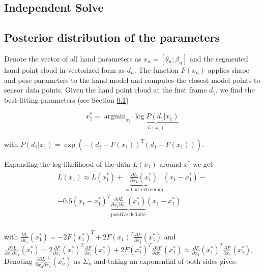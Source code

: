 \documentclass[10pt,twocolumn,letterpaper]{article}
\begin{document}
\subsection {Independent Solve} \label{sec:independent-solve}

\subsection {Posterior distribution of the parameters} \label{sec:posterior}

Denote the vector of all hand parameters as $x_n = [\theta_n; \beta_n]$ and the segmented hand point cloud in vectorized form as $d_n$. The function $F(x_n)$ applies shape and pose parameters to the hand model and computes the closest model points to sensor data points.  Given the hand point cloud at the first frame $d_1$, we find the best-fitting parameters (see Section \ref{sec:independent-solve})

\begin{equation}
x^*_1 = \operatorname{argmin}_{x_1} \underbrace{\log  P(d_1|x_1)}_{L(x_1)} \label{eq:independent}
\end{equation}

with $P(d_1|x_1) = \exp \left( - (d_1 - F(x_1))^T (d_1 - F(x_1)) \right)$.

Expanding the log-likelihood of the data $L(x_1)$ around $x_1^*$ we get
\begin{align}
\begin{split}
 L(x_1) \approx L(x_1^*) + \underbrace{\frac{\partial L}{\partial x_1}(x_1^*)}_{= 0 \text{ at extremum}}(x_1 - x_1^*) - \\
- 0.5(x_1 - x_1^*)^T \underbrace{\frac{\partial \partial L}{\partial x_1 \partial x_1}(x_1^*) }_{\text{positive definite}}  (x_1 - x_1^*) \\
\end{split}
\end{align}

with $\frac{\partial L}{\partial x_1}(x_1^*) = - 2 F(x_1^*)^T + 2 F(x_1)^T \frac{\partial F}{\partial x_1}(x_1^*)  $ and 
$\frac{\partial \partial L}{\partial x_1 \partial x_1}(x_1^*) = 2  \frac{\partial F}{\partial x_1}(x_1^*)^T  \frac{\partial F}{\partial x_1}(x_1^*) + 2 F(x_1^*)^T  \frac{\partial \partial F}{\partial \partial x_1}(x_1^*)  \approx  \frac{\partial F}{\partial x_1}(x_1^*)^T  \frac{\partial F}{\partial x_1}(x_1^*)$. Denoting $\frac{\partial \partial L^{-1}}{\partial x_n \partial x_n}(x_n^*) $ as $\Sigma_n$ and taking an exponential of both sides gives:
\vspace{-2em}
\end{document}
